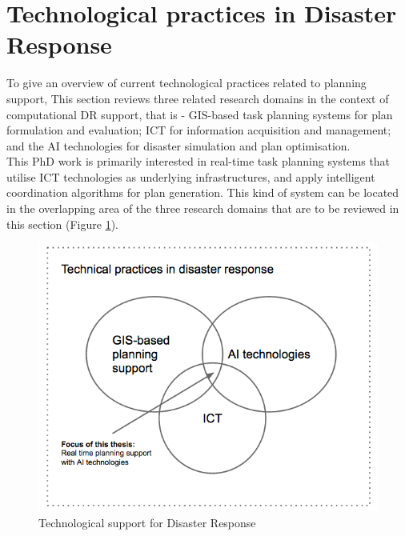 \section{Technological practices in Disaster Response} \label{sec:LRApplicationAreas}
To give an overview of current technological practices related to planning support, This section reviews three related research domains in the context of computational DR support, that is - \ac{GIS}-based task planning systems for plan formulation and evaluation; \acf{ICT} for information acquisition and management; and the \acf{AI} technologies for disaster simulation and plan optimisation.  \\

This PhD work is primarily interested in real-time task planning systems that utilise \ac{ICT} technologies as underlying infrastructures, and apply intelligent coordination algorithms for plan generation. This kind of system can be located in the overlapping area of the three research domains that are to be reviewed in this section (Figure \ref{fig:SystemFraming}).\\

\begin{figure}[h]
  \centering
  \includegraphics[width=1\textwidth]{img/Background/SystemFraming}
  \caption{Technological support for Disaster Response}
  \label{fig:SystemFraming}
\end{figure} 

